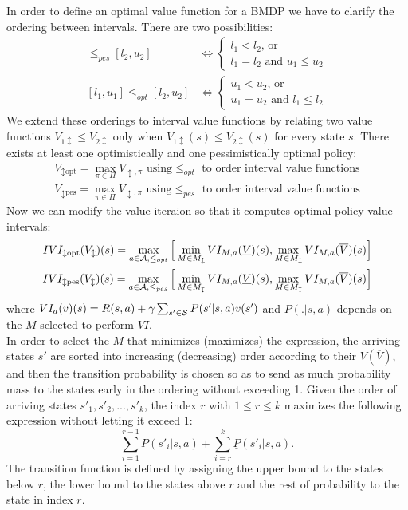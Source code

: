 \newline
In order to define an optimal value function for a \ac{BMDP} we have to clarify the ordering between intervals. There are two possibilities:
\begin{align*}
[l_1, u_1] \leq_{pes} [l_2, u_2] &\Leftrightarrow 
\begin{cases}
l_1 < l_2 \text{, or }\\
l_1 = l_2 \text{ and } u_1 \leq u_2
\end{cases}\\
[l_1, u_1] \leq_{opt} [l_2, u_2] &\Leftrightarrow 
\begin{cases}
u_1 < u_2 \text{, or }\\
u_1 = u_2 \text{ and } l_1 \leq l_2
\end{cases}
\end{align*}
We extend these orderings to interval value functions by relating two value functions $V_{1 \updownarrow} \leq V_{2 \updownarrow}$ only when $V_{1 \updownarrow}(s) \leq V_{2 \updownarrow}(s)$ for every state $s$.
There exists at least one optimistically and one pessimistically optimal policy:
\begin{align*}
V_{\updownarrow \text{opt}} = \max_{\pi \in \Pi} V_{\updownarrow, \pi} \text{ using} \leq_{opt} \text{ to order interval value functions}\\
V_{\updownarrow \text{pes}} = \max_{\pi \in \Pi} V_{\updownarrow, \pi} \text{ using} \leq_{pes} \text{ to order interval value functions}
\end{align*}
Now we can modify the value iteraion so that it computes optimal policy value intervals:
\begin{align*}
IVI_{\updownarrow \text{opt}}(V_{\updownarrow})(s) = \max_{a \in \mathcal{A}, \leq_{opt}} \Big[ \min_{M \in M_{\updownarrow}} VI_{M, a}(\underline{V})(s), \max_{M \in M_{\updownarrow}} VI_{M, a}(\overline{V})(s) \Big]\\
IVI_{\updownarrow \text{pes}}(V_{\updownarrow})(s) = \max_{a \in \mathcal{A}, \leq_{pes}} \Big[ \min_{M \in M_{\updownarrow}} VI_{M, a}(\underline{V})(s), \max_{M \in M_{\updownarrow}} VI_{M, a}(\overline{V})(s) \Big]
\end{align*}
where $VI_{a}(v)(s) = R(s,a) + \gamma \sum_{s' \in \mathcal{S}} P(s'|s,a)v(s')$ and $P(.|s,a)$ depends on the $M$ selected to perform $VI$.\\
\newline
In order to select the $M$ that minimizes (maximizes) the expression, the arriving states $s'$ are sorted into increasing (decreasing) order according to their $\underline{V}(\overline{V})$, and then the transition probability is chosen so as to send as much probability mass to the states early in the ordering without exceeding 1. Given the order of arriving states $s'_1, s'_2, ..., s'_k$, the index $r$ with $1 \leq r \leq k$ maximizes the following expression without letting it exceed 1:
$$\sum_{i=1}^{r-1}\overline{P}(s'_i|s,a) + \sum_{i=r}^{k}\underline{P}(s'_i|s,a).$$
The transition function is defined by assigning the upper bound to the states below $r$, the lower bound to the states above $r$ and the rest of probability to the state in index $r$.

